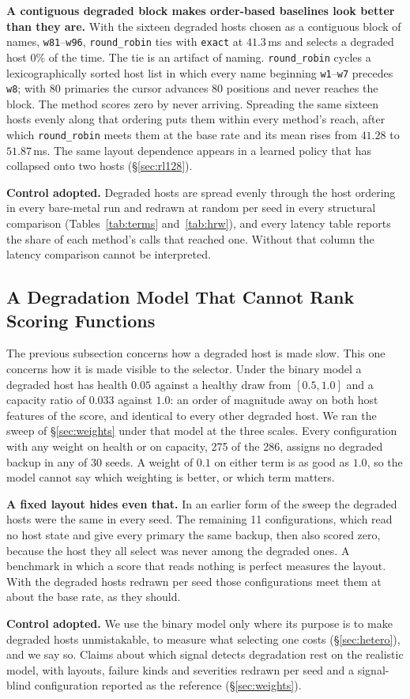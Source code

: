 \textbf{A contiguous degraded block makes order-based baselines look better
than they are.} With the sixteen degraded hosts chosen as a contiguous block of
names, \texttt{w81}--\texttt{w96}, \texttt{round\_robin} ties with
\texttt{exact} at $41.3$\,ms and selects a degraded host $0\%$ of the time. The
tie is an artifact of naming. \texttt{round\_robin} cycles a lexicographically
sorted host list in which every name beginning \texttt{w1}--\texttt{w7}
precedes \texttt{w8}; with 80 primaries the cursor advances 80 positions and
never reaches the block. The method scores zero by never arriving. Spreading
the same sixteen hosts evenly along that ordering puts them within every
method's reach, after which \texttt{round\_robin} meets them at the base rate
and its mean rises from $41.28$ to $51.87$\,ms. The same layout dependence
appears in a learned policy that has collapsed onto two hosts
(\S\ref{sec:rl128}).

\textbf{Control adopted.} Degraded hosts are spread evenly through the host
ordering in every bare-metal run and redrawn at random per seed in every
structural comparison (Tables~\ref{tab:terms} and~\ref{tab:hrw}), and every
latency table reports the share of each method's calls that reached one. Without that
column the latency comparison cannot be interpreted.

\subsection{A Degradation Model That Cannot Rank Scoring Functions}
\label{sec:binarymodel}

The previous subsection concerns how a degraded host is made slow. This one
concerns how it is made visible to the selector. Under the binary model a
degraded host has health $0.05$ against a healthy draw from $[0.5, 1.0]$ and a
capacity ratio of $0.033$ against $1.0$: an order of magnitude away on both
host features of the score, and identical to every other degraded host. We ran
the sweep of \S\ref{sec:weights} under that model at the three scales. Every
configuration with any weight on health or on capacity, 275 of the 286,
assigns no degraded backup in any of 30 seeds. A weight of $0.1$ on either
term is as good as $1.0$, so the model cannot say which weighting is better,
or which term matters.

\textbf{A fixed layout hides even that.} In an earlier form of the sweep the
degraded hosts were the same in every seed. The remaining 11 configurations,
which read no host state and give every primary the same backup, then also
scored zero, because the host they all select was never among the degraded
ones. A benchmark in which a score that reads nothing is perfect measures the
layout. With the degraded hosts redrawn per seed those configurations meet
them at about the base rate, as they should.

\textbf{Control adopted.} We use the binary model only where its purpose is to
make degraded hosts unmistakable, to measure what selecting one costs
(\S\ref{sec:hetero}), and we say so. Claims about which signal detects
degradation rest on the realistic model, with layouts, failure kinds and
severities redrawn per seed and a signal-blind configuration reported as the
reference (\S\ref{sec:weights}).
